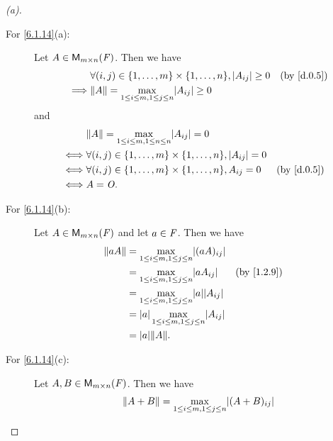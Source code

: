 \begin{proof}[(a)]
  \begin{description}
    \item[For \cref{6.1.14}(a):]
      Let \(A \in \mathsf{M}_{{m} \times n}({\mathit{F}})\).
      Then we have
      \begin{align*}
                 & \forall (i, j) \in \set{1, \dots, m} \times \set{1, \dots, n}, \abs{A_{i j}} \geq 0 &  & \text{(by \cref{d.0.5})} \\
        \implies & \norm{A} = \max_{1 \leq i \leq m, 1 \leq j \leq n} \abs{A_{i j}} \geq 0
      \end{align*}
      and
      \begin{align*}
             & \norm{A} = \max_{1 \leq i \leq m, 1 \leq n \leq n} \abs{A_{i j}} = 0                                           \\
        \iff & \forall (i, j) \in \set{1, \dots, m} \times \set{1, \dots, n}, \abs{A_{i j}} = 0                               \\
        \iff & \forall (i, j) \in \set{1, \dots, m} \times \set{1, \dots, n}, A_{i j} = 0       &  & \text{(by \cref{d.0.5})} \\
        \iff & A = \zm.
      \end{align*}
    \item[For \cref{6.1.14}(b):]
      Let \(A \in \mathsf{M}_{{m} \times n}({\mathit{F}})\) and let \(a \in \mathit{F}\).
      Then we have
      \begin{align*}
        \norm{a A} & = \max_{1 \leq i \leq m, 1 \leq j \leq n} \abs{(a A)_{i j}}                                   \\
                   & = \max_{1 \leq i \leq m, 1 \leq j \leq n} \abs{a A_{i j}}       &  & \text{(by \cref{1.2.9})} \\
                   & = \max_{1 \leq i \leq m, 1 \leq j \leq n} \abs{a} \abs{A_{i j}}                               \\
                   & = \abs{a} \max_{1 \leq i \leq m, 1 \leq j \leq n} \abs{A_{i j}}                               \\
                   & = \abs{a} \norm{A}.
      \end{align*}
    \item[For \cref{6.1.14}(c):]
      Let \(A, B \in \mathsf{M}_{{m} \times n}({\mathit{F}})\).
      Then we have
      \begin{align*}
        \norm{A + B} & = \max_{1 \leq i \leq m, 1 \leq j \leq n} \abs{(A + B)_{i j}}                                                                                  \\

\end{align*}
\end{description}
\end{proof}
